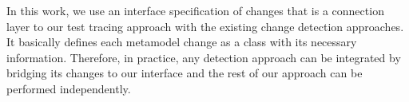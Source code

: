In this work, we use an interface specification of changes {\small{}} that is a connection layer to our test tracing approach with the existing change detection approaches. It basically defines each metamodel change as a class with its necessary information. Therefore, in practice, any detection approach \cite{Alter2015, williams2012searching,cicchetti_managing_2009,langer_posteriori_2013,vermolen_reconstructing_2012,Khelladi2016} can be integrated by bridging its changes to our interface and the rest of our approach can be performed independently. 


